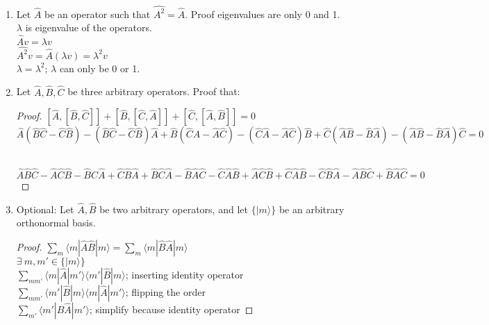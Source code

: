 \documentclass{article}
\begin{document}
\begin{enumerate}
\item Let $\hat{A}$ be an operator such that $\hat{A^2}=\hat{A}$. Proof eigenvalues are only 0 and 1.
\\ $\lambda$ is eigenvalue of the operators.
\\ $\hat{A}v=\lambda v$
\\ $\hat{A^2}v=\hat{A}(\lambda v)=\lambda^2 v$
\\ $\lambda=\lambda^2$; \quad $\lambda$ can only be 0 or 1.

\item Let $\hat{A},\hat{B},\hat{C}$  be three arbitrary operators. Proof that:
\begin{proof}$[\hat{A},[\hat{B},\hat{C}]] + [\hat{B},[\hat{C},\hat{A}]] + [\hat{C},[\hat{A},\hat{B}]] = 0$
\\ $\hat{A}(\hat{B}\hat{C}-\hat{C}\hat{B})-(\hat{B}\hat{C}-\hat{C}\hat{B})\hat{A}+ \hat{B}(\hat{C}\hat{A}-\hat{A}\hat{C})-(\hat{C}\hat{A}-\hat{A}\hat{C})\hat{B}+
\hat{C}(\hat{A}\hat{B}-\hat{B}\hat{A})-(\hat{A}\hat{B}-\hat{B}\hat{A})\hat{C}=0$

\\ $\hat{A}\hat{B}\hat{C}-\hat{A}\hat{C}\hat{B}-\hat{B}\hat{C}\hat{A}+\hat{C}\hat{B}\hat{A}+\hat{B}\hat{C}\hat{A}-\hat{B}\hat{A}\hat{C}-\hat{C}\hat{A}\hat{B}+\hat{A}\hat{C}\hat{B}+\hat{C}\hat{A}\hat{B}-\hat{C}\hat{B}\hat{A}-\hat{A}\hat{B}\hat{C}+\hat{B}\hat{A}\hat{C}=0$ \end{proof}

\item Optional: Let $\hat{A},\hat{B}$ be two arbitrary operators, and let $\{|m\rangle\}$ be an arbitrary orthonormal basis. 
\begin{proof} $\sum_m \langle m|\hat{A}\hat{B}|m\rangle=\sum_m \langle m|\hat{B}\hat{A}|m\rangle$
\\ $\exists~m, m' \in \{|m\rangle\}$
\\ $\sum_{mm'} \langle m|\hat{A}|m'\rangle\langle m'|\hat{B}|m\rangle$; inserting identity operator
\\ $\sum_{mm'} \langle m'|\hat{B}|m\rangle\langle m|\hat{A}|m'\rangle$; flipping the order
\\ $\sum_{m'} \langle m'|\hat{B}\hat{A}|m'\rangle$; simplify because identity operator \end{proof}
\end{enumerate}%
\end{document}
